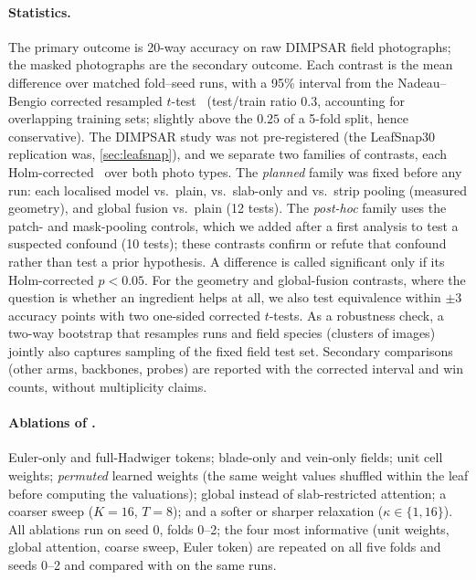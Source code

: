 \paragraph{Statistics.} The primary outcome is 20-way accuracy on raw DIMPSAR field photographs; the
masked photographs are the secondary outcome. Each contrast is the mean difference over matched
fold--seed runs, with a 95\% interval from the Nadeau--Bengio corrected resampled
$t$-test~\citep{nadeau2003inference} (test/train ratio $0.3$, accounting for overlapping training
sets; slightly above the $0.25$ of a 5-fold split, hence conservative). The DIMPSAR study was not pre-registered (the LeafSnap30 replication was, \cref{sec:leafsnap}),
and we separate two families of contrasts, each
Holm-corrected~\citep{holm1979simple} over both photo types. The \emph{planned} family was fixed
before any run: each localised model vs.\ plain, \SVA{} vs.\ slab-only and vs.\ strip pooling
(measured geometry), and global fusion vs.\ plain (12 tests). The \emph{post-hoc} family uses the
patch- and mask-pooling controls, which we added after a first analysis to test a suspected confound
(10 tests); these contrasts confirm or refute that confound rather than test a prior hypothesis. A
difference is called significant only if its Holm-corrected $p<0.05$. For the geometry and
global-fusion contrasts, where the question is whether an ingredient helps at all, we also test
equivalence within $\pm3$ accuracy points with two one-sided corrected $t$-tests. As a robustness
check, a two-way bootstrap that resamples runs and field species (clusters of images) jointly also
captures sampling of the fixed field test set. Secondary comparisons (other arms, backbones, probes)
are reported with the corrected interval and win counts, without multiplicity claims.
\paragraph{Ablations of \SVA{}.} Euler-only and full-Hadwiger tokens; blade-only and vein-only
fields; unit cell weights; \emph{permuted} learned weights (the same weight values shuffled within the
leaf before computing the valuations); global instead of slab-restricted attention; a coarser sweep
($K{=}16$, $T{=}8$); and a softer or sharper relaxation ($\kappa\in\{1,16\}$). All ablations run on
seed 0, folds 0--2; the four most informative (unit weights, global attention, coarse sweep, Euler
token) are repeated on all five folds and seeds 0--2 and compared with \SVA{} on the same runs.

